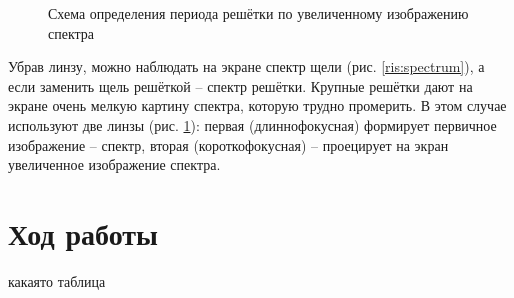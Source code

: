 \documentclass[a5paper,10pt, twoside]{article} %
\begin{document}
	\begin{figure}[h]
		\caption{Схема определения периода решётки по увеличенному изображению спектра}
		\label{ris:d_per}
	\end{figure}
	
	Убрав линзу, можно наблюдать на экране спектр щели (рис. \ref{ris:spectrum}), а если заменить 
	щель решёткой -- спектр решётки. Крупные решётки дают на экране очень мелкую картину спектра, 
	которую трудно промерить. В этом случае используют две линзы (рис. \ref{ris:d_per}): первая 
	(длиннофокусная) формирует первичное изображение -- спектр, вторая (короткофокусная) -- 
	проецирует на экран увеличенное изображение спектра.

	


\section{Ход работы}

\begin{table}[h!]
	\caption{какаято таблица}
\end{table}
\end{document}
